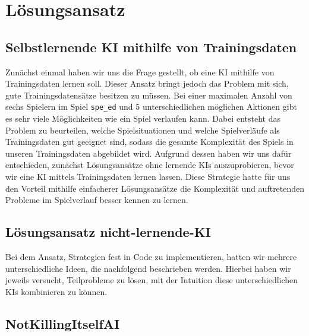 \chapter{Lösungsansatz}
\label{ch:loesungsansatz}


\section{Selbstlernende KI mithilfe von Trainingsdaten}
\label{sec:selbstlernende-ki-trainingsdaten}

Zunächst einmal haben wir uns die Frage gestellt, ob eine \acs{KI} mithilfe von Trainingsdaten lernen soll.
Dieser Ansatz bringt jedoch das Problem mit sich, gute Trainingsdatensätze besitzen zu müssen. 
Bei einer maximalen Anzahl von sechs Spielern im Spiel \texttt{spe\_ed} und 5 unterschiedlichen möglichen Aktionen gibt
es sehr viele Möglichkeiten wie ein Spiel verlaufen kann. 
Dabei entsteht das Problem zu beurteilen, welche Spielsituationen und welche Spielverläufe als Trainingsdaten gut geeignet sind, 
sodass die gesamte Komplexität des Spiels in unseren Trainingsdaten abgebildet wird.
Aufgrund dessen haben wir uns dafür entschieden, zunächst Lösungsansätze ohne lernende \acs{KI}s auszuprobieren, bevor wir eine \acs{KI} mittels Trainingsdaten lernen lassen. 
Diese Strategie hatte für uns den Vorteil mithilfe einfacherer Lösungsansätze die Komplexität und auftretenden Probleme im Spielverlauf besser kennen zu lernen.


\section{Lösungsansatz nicht-lernende-KI}
\label{sec:loesungsansatz-nicht-lernende-KI}

Bei dem Ansatz, Strategien fest in Code zu implementieren, hatten wir mehrere unterschiedliche Ideen, 
die nachfolgend beschrieben werden. Hierbei haben wir jeweils versucht, Teilprobleme zu lösen,
mit der Intuition diese unterschiedlichen \acs{KI}s kombinieren zu können.

\section{NotKillingItselfAI}
\label{sec:notkillingitself-ai}


